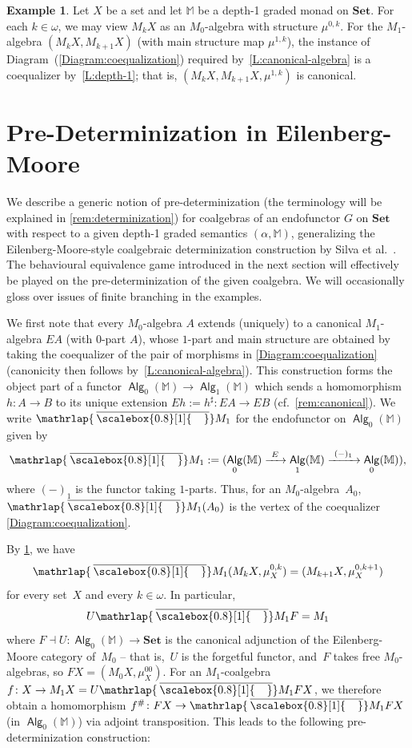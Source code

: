 \documentclass[sigconf,
			final%
			nonacm
                        ]{acmart}
\numberwithin{equation}{section}
\numberwithin{equation}{section}
\theoremstyle{plain}
\theoremstyle{definition}
\newtheorem{expl}[thm]{Example}
\newcommand{\mybar}[3]{%
  \mathrlap{\hspace{#2}\overline{\scalebox{#1}[1]{\hphantom{\ensuremath{#3}}\vphantom{\rule{0pt}{5.5pt}}}}}\ensuremath{#3}
}
\newcommand{\barM}{\mybar{0.8}{2pt}{M}_1}
\newcommand{\xra}[1]{\xrightarrow{~#1~}}
\newcommand{\M}{\mathbb{M}}                   %
\newcommand{\Set}{\mathbf{Set}}
\DeclareMathOperator{\Alg}{\mathsf{Alg}}
\begin{document}
\begin{expl}\label{E:canonical}
  Let $X$ be a set and let $\M$ be a depth-1 graded monad on $\Set.$
  For each ${k\in\omega}$, we may view $M_kX$ as an $M_0$-algebra with
  structure $\mu^{0,k}$. For the $M_1$-algebra $(M_kX, M_{k+1}X)$
  (with main structure map $\mu^{1,k}$), the instance of
  Diagram~(\ref{Diagram:coequalization}) required
  by~\cref{L:canonical-algebra} is a coequalizer
  by~\cref{L:depth-1}; that is, $(M_kX, M_{k+1}X, \mu^{1,k})$ is
  canonical.
\end{expl}
%

\section{Pre-Determinization in Eilenberg-Moore}\label{sec:determinization}
We describe a generic notion of pre-determinization (the terminology
will be explained in \cref{rem:determinization}) for coalgebras of
an endofunctor $G$ on $\Set$ with respect to a given depth-1 graded
semantics $(\alpha,\M)$, generalizing the Eilenberg-Moore-style
coalgebraic determinization construction by Silva et
al.~\cite{BBSR13}. The behavioural equivalence game introduced in the
next section will effectively be played on the pre-determinization of
the given coalgebra. We will occasionally gloss over issues of finite
branching in the examples.

We first note that every $M_0$-algebra $A$ extends (uniquely) to a
canonical $M_1$-algebra $EA$ (with $0$-part $A$), whose $1$-part and
main structure are obtained by taking the coequalizer of the pair of
morphisms in \eqref{Diagram:coequalization} (canonicity then follows
by~\cref{L:canonical-algebra}). This construction forms the object
part of a functor $\Alg_0(\M)\to\Alg_1(\M)$ which sends a homomorphism
$h\colon A\to B$ to its unique extension $Eh:=h^\sharp\colon EA\to EB$
(cf.~\cref{rem:canonical}). We write $\barM$ for the endofunctor on
$\Alg_0(\M)$ given by
\begin{equation}\label{eq:barM}
\barM:= (\Alg_0(\M)\xra{E}\Alg_1(\M)\xra{(-)_1}\Alg_0(\M)),
\end{equation}
where $(-)_1$ is the functor taking $1$-parts.  Thus, for an
$M_0$-algebra~$A_0$, $\barM(A_0)$ is the vertex of the coequalizer
\eqref{Diagram:coequalization}.

By \cref{E:canonical}, we have
\begin{equation}
  \label{eq:barM-can}
  \barM(M_kX,\mu^{0,k}_X)=(M_{k+1}X,\mu^{0,k+1}_X)
\end{equation}
for every set~$X$ and every $k\in\omega$. In particular,
\begin{equation}\label{Eq:determinization}
  U\barM F = M_1
\end{equation}
where $F\dashv U\colon \Alg_0(\M) \to \Set$ is the canonical
adjunction of the Eilenberg-Moore category of~$M_0$ -- that is,~$U$ is
the forgetful functor, and~$F$ takes free $M_0$-algebras, so
$FX=(M_0X,\mu^{00}_X)$. For an $M_1$-coalgebra
$f\colon X\to M_1X=U\barM FX$, we therefore obtain a homomorphism
$f^\#\colon FX\to\barM FX$ (in $\Alg_0(\M)$) via adjoint
transposition. This leads to the following pre-determinization
construction:
\end{document}
